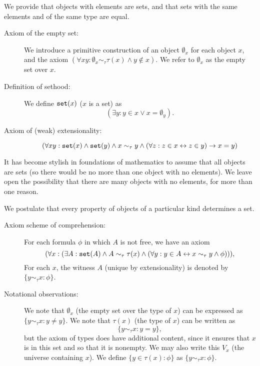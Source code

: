 \documentclass[12pt]{book}
\begin{document}
We provide that objects with elements are sets, and that sets with the same elements and of the same type are equal.

\begin{description}

\item[Axiom of the empty set:]  We introduce a primitive construction of an object $\emptyset_x$ for each object $x$, and the axiom $(\forall xy:\emptyset_x \sim_\tau \tau(x) \wedge y \not\in x).$   We refer to $\emptyset_x$ as the empty set over $x$.

\item[Definition of sethood:]  We define ${\tt set}(x)$ ($x$ is a set) as $$(\exists y:y \in x \vee x=\emptyset_y).$$

\item[Axiom of (weak) extensionality:]  $$(\forall xy: {\tt set}(x) \wedge {\tt set}(y) \wedge x \sim_\tau y \wedge (\forall z:z\in x \leftrightarrow z \in y) \rightarrow x=y)$$

\end{description}

It has become stylish in foundations of mathematics to assume that all objects are sets (so there would be no more than one object with no elements).  We leave open the possibility that there are many objects with no elements, for more than one reason.



We postulate that every property of objects of a particular kind determines a set.

\begin{description}

\item[Axiom scheme of comprehension:]  For each formula $\phi$ in which $A$ is not free, we have an axiom $$(\forall x:(\exists A: {\tt set}(A) \wedge A \sim_\tau \tau(x) \wedge (\forall y:y \in A \leftrightarrow x \sim_\tau y \wedge \phi))),$$  For each $x$, the witness $A$ (unique by extensionality) is denoted by $\{y \sim_\tau x:\phi\}$.  

\item[Notational observations:]  We note that $\emptyset_x$ (the empty set over the type of $x$) can be expressed as $\{y \sim_\tau x:y \neq y\}$.  We note that $\tau(x)$ (the type of $x$) can be written as $$\{y \sim_\tau x:y = y\},$$ but the axiom of types does have additional content, since it ensures that $x$ is in this set and so that it is nonempty.  We may also write this $V_x$ (the universe containing $x$).  We define $\{y \in \tau(x):\phi\}$ as $\{y \sim_\tau x:\phi\}$.  



\end{description}
\end{document}
